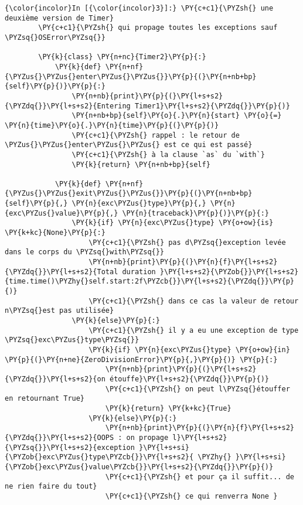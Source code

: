     \begin{Verbatim}[commandchars=\\\{\}]
{\color{incolor}In [{\color{incolor}3}]:} \PY{c+c1}{\PYZsh{} une deuxième version de Timer}
        \PY{c+c1}{\PYZsh{} qui propage toutes les exceptions sauf \PYZsq{}OSError\PYZsq{}}
        
        \PY{k}{class} \PY{n+nc}{Timer2}\PY{p}{:}
            \PY{k}{def} \PY{n+nf}{\PYZus{}\PYZus{}enter\PYZus{}\PYZus{}}\PY{p}{(}\PY{n+nb+bp}{self}\PY{p}{)}\PY{p}{:}
                \PY{n+nb}{print}\PY{p}{(}\PY{l+s+s2}{\PYZdq{}}\PY{l+s+s2}{Entering Timer1}\PY{l+s+s2}{\PYZdq{}}\PY{p}{)}
                \PY{n+nb+bp}{self}\PY{o}{.}\PY{n}{start} \PY{o}{=} \PY{n}{time}\PY{o}{.}\PY{n}{time}\PY{p}{(}\PY{p}{)}
                \PY{c+c1}{\PYZsh{} rappel : le retour de \PYZus{}\PYZus{}enter\PYZus{}\PYZus{} est ce qui est passé}
                \PY{c+c1}{\PYZsh{} à la clause `as` du `with`}
                \PY{k}{return} \PY{n+nb+bp}{self}
            
            \PY{k}{def} \PY{n+nf}{\PYZus{}\PYZus{}exit\PYZus{}\PYZus{}}\PY{p}{(}\PY{n+nb+bp}{self}\PY{p}{,} \PY{n}{exc\PYZus{}type}\PY{p}{,} \PY{n}{exc\PYZus{}value}\PY{p}{,} \PY{n}{traceback}\PY{p}{)}\PY{p}{:}
                \PY{k}{if} \PY{n}{exc\PYZus{}type} \PY{o+ow}{is} \PY{k+kc}{None}\PY{p}{:}
                    \PY{c+c1}{\PYZsh{} pas d\PYZsq{}exception levée dans le corps du \PYZsq{}with\PYZsq{}}
                    \PY{n+nb}{print}\PY{p}{(}\PY{n}{f}\PY{l+s+s2}{\PYZdq{}}\PY{l+s+s2}{Total duration }\PY{l+s+s2}{\PYZob{}}\PY{l+s+s2}{time.time()\PYZhy{}self.start:2f\PYZcb{}}\PY{l+s+s2}{\PYZdq{}}\PY{p}{)}
                    \PY{c+c1}{\PYZsh{} dans ce cas la valeur de retour n\PYZsq{}est pas utilisée}
                \PY{k}{else}\PY{p}{:}
                    \PY{c+c1}{\PYZsh{} il y a eu une exception de type \PYZsq{}exc\PYZus{}type\PYZsq{}}
                    \PY{k}{if} \PY{n}{exc\PYZus{}type} \PY{o+ow}{in} \PY{p}{(}\PY{n+ne}{ZeroDivisionError}\PY{p}{,}\PY{p}{)} \PY{p}{:}
                        \PY{n+nb}{print}\PY{p}{(}\PY{l+s+s2}{\PYZdq{}}\PY{l+s+s2}{on étouffe}\PY{l+s+s2}{\PYZdq{}}\PY{p}{)}
                        \PY{c+c1}{\PYZsh{} on peut l\PYZsq{}étouffer en retournant True}
                        \PY{k}{return} \PY{k+kc}{True}
                    \PY{k}{else}\PY{p}{:}
                        \PY{n+nb}{print}\PY{p}{(}\PY{n}{f}\PY{l+s+s2}{\PYZdq{}}\PY{l+s+s2}{OOPS : on propage l}\PY{l+s+s2}{\PYZsq{}}\PY{l+s+s2}{exception }\PY{l+s+si}{\PYZob{}exc\PYZus{}type\PYZcb{}}\PY{l+s+s2}{ \PYZhy{} }\PY{l+s+si}{\PYZob{}exc\PYZus{}value\PYZcb{}}\PY{l+s+s2}{\PYZdq{}}\PY{p}{)}
                        \PY{c+c1}{\PYZsh{} et pour ça il suffit... de ne rien faire du tout}
                        \PY{c+c1}{\PYZsh{} ce qui renverra None }
\end{Verbatim}


